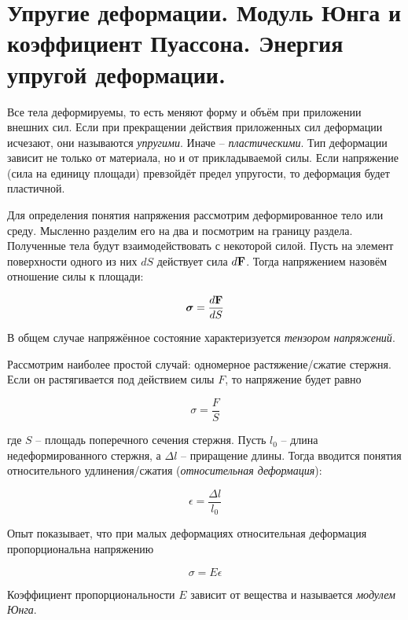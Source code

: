 \section{Упругие деформации. Модуль Юнга и коэффициент Пуассона. Энергия упругой деформации.}

Все тела деформируемы, то есть меняют форму и объём при приложении внешних сил. Если при прекращении действия приложенных сил деформации исчезают, они называются \textit{упругими}. Иначе -- \textit{пластическими}. Тип деформации зависит не только от материала, но и от прикладываемой силы. Если напряжение (сила на единицу площади) превзойдёт предел упругости, то деформация будет пластичной.

Для определения понятия напряжения рассмотрим деформированное тело или среду. Мысленно разделим его на два и посмотрим на границу раздела. Полученные тела будут взаимодействовать с некоторой силой. Пусть на элемент поверхности одного из них $dS$ действует сила $d \mathbf F$. Тогда напряжением назовём отношение силы к площади:

\begin{equation}
    \boldsymbol \sigma = \frac{d \mathbf F}{dS}
\end{equation}

\noindent
В общем случае напряжённое состояние характеризуется \textit{тензором напряжений}.

Рассмотрим наиболее простой случай: одномерное растяжение/сжатие стержня. Если он растягивается под действием силы $F$, то напряжение будет равно

\begin{equation*}
    \sigma = \frac{F}{S}
\end{equation*}

\noindent
где $S$ -- площадь поперечного сечения стержня. Пусть $l_0$ -- длина недеформированного стержня, а $\Delta l$ -- приращение длины. Тогда вводится понятия относительного удлинения/сжатия (\textit{относительная деформация}):

\begin{equation}
    \epsilon = \frac{\Delta l}{l_0}
\end{equation}

Опыт показывает, что при малых деформациях относительная деформация пропорциональна напряжению

\begin{equation} \label{eq:закон гука}
    \sigma = E \epsilon
\end{equation}

\noindent
Коэффициент пропорциональности $E$ зависит от вещества и называется \textit{модулем Юнга}.


